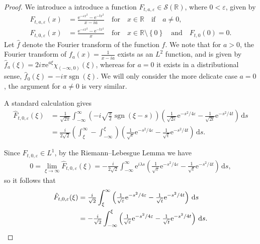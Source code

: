\documentclass[12pt, a4paper,reqno]{amsart}
\numberwithin{equation}{section}
\DeclareMathOperator{\sgn}{sgn}
\newcommand\R{\mathbb R}
\newcommand\e{\mathrm{e}}
\newcommand\cS{\mathcal{S}}
\newcommand\eps{\varepsilon}
\renewcommand{\d}{\mathrm{d}}
\newcommand\be{\begin{equation}\begin{aligned}}
\newcommand\ee{\end{aligned}\end{equation}}
\newcommand{\set}[1]{\left\{ #1 \right\}}
\newcommand{\pa}[1]{\left( #1 \right)}
\newcommand{\qtx}[1]{\quad\text{#1}\quad}
\begin{document}
\begin{proof} 

We introduce a introduce a function $F_{t,a,\eps} \in \cS(\R)$, where   $0<\eps$,
given by
    \be\label{defanf}
   F_{t,a,\eps} (x)&= \frac{\e^{-\eps x^2}-\e^{-t x^2}}{x-ia} \qtx{for} x \in \R \qtx{if} a\ne 0,\\
    F_{t,0,\eps} (x)&= \frac{\e^{-\eps x^2}-\e^{-t x^2}}{x} \qtx{for} x \in  \R\setminus \set{0} \qtx{and} F_{t,0} (0)=0.
   \ee 
Let  $\hat f$ denote the Fourier transform of the function $f$. 
We note that for $a>0$, the Fourier transform of $f_a(x)=\frac1{x-ia}$ exists as an $L^2$  function, and is given by $\hat f_a(\xi)=2i\pi\e^{a\xi}\chi_{(-\infty,0)}(\xi)$, whereas for $a=0$ it exists in a distributional sense, $\hat f_0(\xi)=-i\pi\sgn(\xi)$. We will only consider the more delicate case $a=0$, the argument for $a\neq0$ is very similar. 

 A standard calculation gives
\be
\hat F_{t,0,\eps}(\xi)
&= \tfrac 1 {\sqrt{2\pi}}\int_{-\infty}^\infty \pa{-i \sqrt{\tfrac \pi 2} \sgn (\xi-s) }\pa{\tfrac{1}{\sqrt{2\eps}}\e^{-s^2/4\eps} -\tfrac{1}{\sqrt{2 t}}\e^{-s^2/4t} } \, \d s\\ &
 = \tfrac i {2\sqrt{2}}  \pa{\int_{\xi}^{\infty} -  \int_{-\infty}^\xi } \pa{\tfrac{1}{\sqrt\eps}\e^{-s^2/4\eps} -\tfrac{1}{\sqrt t}\e^{-s^2/4t} } \, \d s.
\ee 


Since  $F_{t,0,\eps}\in L^1$, by the Riemann--Lebesgue Lemma we have
\be
0= \lim_{\xi \to \infty} \hat F_{t,0,\eps}(\xi)= -\tfrac i {2\sqrt{2}}  \int_{-\infty}^\infty   \e^{i\lambda s}\pa{\frac{1}{\sqrt\eps}\e^{-s^2/4\eps} -\frac{1}{\sqrt t}\e^{-s^2/4t} } \, \d s,
\ee
so it follows that
\be
\hat F_{t,0,\eps}(\xi)&= \tfrac i {\sqrt{2}}  \int_{\xi}^{\infty} \pa{\tfrac{1}{\sqrt\eps}\e^{-s^2/4\eps} -\tfrac{1}{\sqrt t}\e^{-s^2/4t} } \, \d s\\ & \notag
=- \tfrac i {\sqrt{2}}  \int_{-\infty}^\xi    \pa{\tfrac{1}{\sqrt\eps}\e^{-s^2/4\eps} -\tfrac{1}{\sqrt t}\e^{-s^2/4t} } \, \d s.
\ee



\end{proof}
\end{document}
